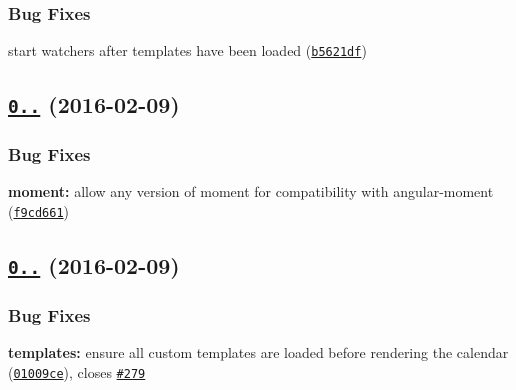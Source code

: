 \subsubsection*{Bug Fixes}


\begin{DoxyItemize}
\item start watchers after templates have been loaded (\href{https://github.com/mattlewis92/angular-bootstrap-calendar/commit/b5621df}{\tt b5621df})
\end{DoxyItemize}

\label{_0.18.6}%
 \subsection*{\href{https://github.com/mattlewis92/angular-bootstrap-calendar/compare/0.18.5...v0.18.6}{\tt 0..} (2016-\/02-\/09)}

\subsubsection*{Bug Fixes}


\begin{DoxyItemize}
\item {\bfseries moment\+:} allow any version of moment for compatibility with angular-\/moment (\href{https://github.com/mattlewis92/angular-bootstrap-calendar/commit/f9cd661}{\tt f9cd661})
\end{DoxyItemize}

\label{_0.18.5}%
 \subsection*{\href{https://github.com/mattlewis92/angular-bootstrap-calendar/compare/0.18.4...v0.18.5}{\tt 0..} (2016-\/02-\/09)}

\subsubsection*{Bug Fixes}


\begin{DoxyItemize}
\item {\bfseries templates\+:} ensure all custom templates are loaded before rendering the calendar (\href{https://github.com/mattlewis92/angular-bootstrap-calendar/commit/01009ce}{\tt 01009ce}), closes \href{https://github.com/mattlewis92/angular-bootstrap-calendar/issues/279}{\tt \#279}
\end{DoxyItemize}

